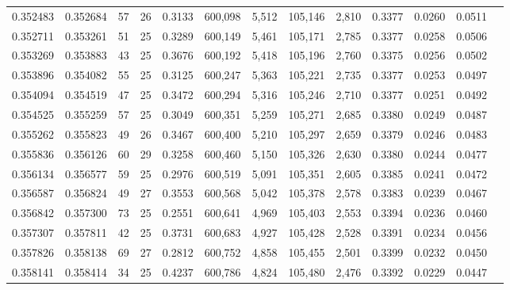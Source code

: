 \begin{tabular}{rrrrrrrrrrrrr}
0.352483 & 0.352684 &  57 &  26 &                                     0.3133 & 600,098 &   5,512 & 105,146 &   2,810 & 0.3377 & 0.0260 & 0.0511 \\
0.352711 & 0.353261 &  51 &  25 &                                     0.3289 & 600,149 &   5,461 & 105,171 &   2,785 & 0.3377 & 0.0258 & 0.0506 \\
0.353269 & 0.353883 &  43 &  25 &                                     0.3676 & 600,192 &   5,418 & 105,196 &   2,760 & 0.3375 & 0.0256 & 0.0502 \\
0.353896 & 0.354082 &  55 &  25 &                                     0.3125 & 600,247 &   5,363 & 105,221 &   2,735 & 0.3377 & 0.0253 & 0.0497 \\
0.354094 & 0.354519 &  47 &  25 &                                     0.3472 & 600,294 &   5,316 & 105,246 &   2,710 & 0.3377 & 0.0251 & 0.0492 \\
0.354525 & 0.355259 &  57 &  25 &                                     0.3049 & 600,351 &   5,259 & 105,271 &   2,685 & 0.3380 & 0.0249 & 0.0487 \\
0.355262 & 0.355823 &  49 &  26 &                                     0.3467 & 600,400 &   5,210 & 105,297 &   2,659 & 0.3379 & 0.0246 & 0.0483 \\
0.355836 & 0.356126 &  60 &  29 &                                     0.3258 & 600,460 &   5,150 & 105,326 &   2,630 & 0.3380 & 0.0244 & 0.0477 \\
0.356134 & 0.356577 &  59 &  25 &                                     0.2976 & 600,519 &   5,091 & 105,351 &   2,605 & 0.3385 & 0.0241 & 0.0472 \\
0.356587 & 0.356824 &  49 &  27 &                                     0.3553 & 600,568 &   5,042 & 105,378 &   2,578 & 0.3383 & 0.0239 & 0.0467 \\
0.356842 & 0.357300 &  73 &  25 &                                     0.2551 & 600,641 &   4,969 & 105,403 &   2,553 & 0.3394 & 0.0236 & 0.0460 \\
0.357307 & 0.357811 &  42 &  25 &                                     0.3731 & 600,683 &   4,927 & 105,428 &   2,528 & 0.3391 & 0.0234 & 0.0456 \\
0.357826 & 0.358138 &  69 &  27 &                                     0.2812 & 600,752 &   4,858 & 105,455 &   2,501 & 0.3399 & 0.0232 & 0.0450 \\
0.358141 & 0.358414 &  34 &  25 &                                     0.4237 & 600,786 &   4,824 & 105,480 &   2,476 & 0.3392 & 0.0229 & 0.0447 \\

\end{tabular}
